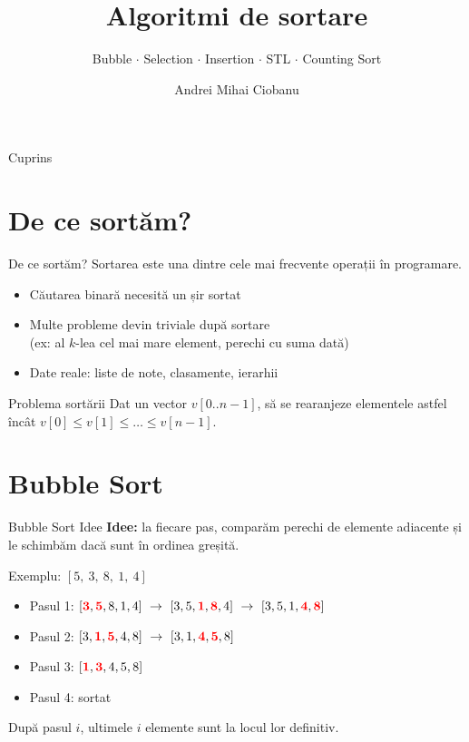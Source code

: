 \documentclass{beamer}
\title{Algoritmi de sortare}
\subtitle{Bubble $\cdot$ Selection $\cdot$ Insertion $\cdot$ STL $\cdot$ Counting Sort}
\author{Andrei Mihai Ciobanu}
\institute{Algolymp Summer School}
\date{}
\begin{document}
\begin{frame}
  \titlepage
\end{frame}

\begin{frame}{Cuprins}
  \tableofcontents
\end{frame}

\section{De ce sortăm?}

\begin{frame}{De ce sortăm?}
  Sortarea este una dintre cele mai frecvente operații în programare.
  \bigskip
  \begin{itemize}
    \item Căutarea binară necesită un șir sortat
    \item Multe probleme devin triviale după sortare \\
          (ex: al $k$-lea cel mai mare element, perechi cu suma dată)
    \item Date reale: liste de note, clasamente, ierarhii
  \end{itemize}
  \bigskip
  \begin{block}{Problema sortării}
    Dat un vector $v[0..n-1]$, să se rearanjeze elementele astfel încât
    $v[0] \leq v[1] \leq \ldots \leq v[n-1]$.
  \end{block}
\end{frame}

\section{Bubble Sort}

\begin{frame}{Bubble Sort \textemdash{} Idee}
  \textbf{Idee:} la fiecare pas, comparăm perechi de elemente adiacente și le schimbăm dacă sunt în ordinea greșită.
  \bigskip

  Exemplu: $[5,\ 3,\ 8,\ 1,\ 4]$
  \begin{itemize}
    \item Pasul 1: $[\textcolor{red}{\mathbf{3}}, \textcolor{red}{\mathbf{5}}, 8, 1, 4]\ \rightarrow\ [3, 5, \textcolor{red}{\mathbf{1}}, \textcolor{red}{\mathbf{8}}, 4]\ \rightarrow\ [3, 5, 1, \textcolor{red}{\mathbf{4}}, \textcolor{red}{\mathbf{8}}]$
    \item Pasul 2: $[3, \textcolor{red}{\mathbf{1}}, \textcolor{red}{\mathbf{5}}, 4, 8]\ \rightarrow\ [3, 1, \textcolor{red}{\mathbf{4}}, \textcolor{red}{\mathbf{5}}, 8]$
    \item Pasul 3: $[\textcolor{red}{\mathbf{1}}, \textcolor{red}{\mathbf{3}}, 4, 5, 8]$
    \item Pasul 4: sortat \checkmark
  \end{itemize}
  \medskip
  După pasul $i$, ultimele $i$ elemente sunt la locul lor definitiv.
\end{frame}
\end{document}
